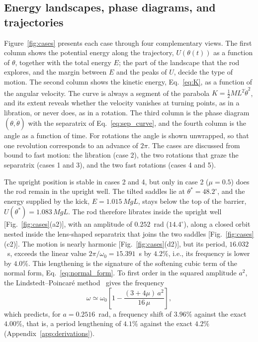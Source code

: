 \subsection{Energy landscapes, phase diagrams, and trajectories}\label{sec:cases_results}

Figure~\ref{fig:cases} presents each case through four complementary views. The first column shows the potential energy along the trajectory, $U(\theta(t))$ as a function of $\theta$, together with the total energy $E$; the part of the landscape that the rod explores, and the margin between $E$ and the peaks of $U$, decide the type of motion. The second column shows the kinetic energy, Eq.~\eqref{eq:K}, as a function of the angular velocity. The curve is always a segment of the parabola $K=\frac12ML^{2}\dot\theta^{2}$, and its extent reveals whether the velocity vanishes at turning points, as in a libration, or never does, as in a rotation. The third column is the phase diagram $(\theta,\dot\theta)$ with the separatrix of Eq.~\eqref{eq:sep_curve}, and the fourth column is the angle as a function of time. For rotations the angle is shown unwrapped, so that one revolution corresponds to an advance of $2\pi$. The cases are discussed from bound to fast motion: the libration (case 2), the two rotations that graze the separatrix (cases 1 and 3), and the two fast rotations (cases 4 and 5).

The upright position is stable in cases 2 and 4, but only in case 2 ($\mu=0.5$) does the rod remain in the upright well. The tilted saddles lie at $\theta^{*}=48.2^{\circ}$, and the energy supplied by the kick, $E=1.015\,MgL$, stays below the top of the barrier, $U(\theta^{*})=1.083\,MgL$. The rod therefore librates inside the upright well [Fig.~\ref{fig:cases}(a2)], with an amplitude of $0.252$~rad ($14.4^{\circ}$), along a closed orbit nested inside the lens-shaped separatrix that joins the two saddles [Fig.~\ref{fig:cases}(c2)]. The motion is nearly harmonic [Fig.~\ref{fig:cases}(d2)], but its period, $16.032$~s, exceeds the linear value $2\pi/\omega_0=15.391$~s by $4.2\%$, i.e., its frequency is lower by $4.0\%$. This lengthening is the signature of the softening cubic term of the normal form, Eq.~\eqref{eq:normal_form}. To first order in the squared amplitude $a^{2}$, the Lindstedt--Poincar\'e method~\cite{Strogatz2015} gives the frequency
\begin{equation}
\omega \simeq \omega_0\left[1-\frac{(3+4\mu)\,a^{2}}{16\,\mu}\right],
\label{eq:lindstedt}
\end{equation}
which predicts, for $a=0.2516$~rad, a frequency shift of $3.96\%$ against the exact $4.00\%$, that is, a period lengthening of $4.1\%$ against the exact $4.2\%$ (Appendix~\ref{app:derivations}).

